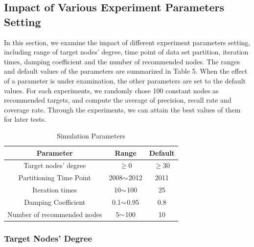 \documentclass[10pt,journal,compsoc]{IEEEtran}
\begin{document}
\subsection{Impact of Various Experiment Parameters Setting}
In this section, we examine the impact of different experiment parameters setting, including range of target nodes' degree, time point of data set partition, iteration times, damping coefficient and the number of recommended nodes. The ranges and default values of the parameters are summarized in Table 5. When the effect of a parameter is under examination, the other parameters are set to the default values. For each experiments, we randomly chose 100 constant nodes as recommended targets, and compute the average of precision, recall rate and coverage rate. Through the experiments, we can attain the best values of them for later tests.
\begin{table}
\renewcommand{\arraystretch}{1.2}
\centering
\caption{Simulation Parameters}
\begin{tabular}{|c|c|c|}                                                       \hline
Parameter                    & Range                           & Default    \\ \hline
Target nodes' degree         & $\geq 0$           & $\geq 30$          \\ \hline
Partitioning Time Point      & 2008$\scriptsize{\sim}$2012     & 2011       \\ \hline
Iteration times              & 10$\scriptsize{\sim}$100        & 25         \\ \hline
Damping Coefficient          & 0.1$\scriptsize{\sim}$0.95      & 0.8       \\ \hline
Number of recommended nodes  & 5$\scriptsize{\sim}$100         & 10        \\ \hline
\end{tabular}
\end{table}

\subsubsection{Target Nodes' Degree}
\end{document}
